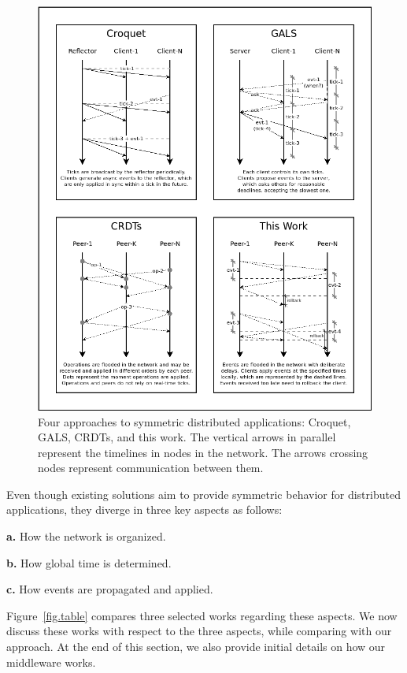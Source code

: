 \documentclass[fleqn,10pt]{SelfArx}
\begin{document}
\begin{figure}
  \centering
  \includegraphics[width=\linewidth]{algos}
  \caption{
    \label{fig.algos}
    Four approaches to symmetric distributed applications: Croquet, GALS,
    CRDTs, and this work.
    The vertical arrows in parallel represent the timelines in nodes in the
    network.
    The arrows crossing nodes represent communication between them.
  }
\end{figure}

Even though existing solutions aim to provide symmetric behavior for
distributed applications, they diverge in three key aspects as follows:

\textbf{a.} How the network is organized.

\textbf{b.} How global time is determined.

\textbf{c.} How events are propagated and applied.

Figure~\ref{fig.table} compares three selected works regarding these aspects.
We now discuss these works with respect to the three aspects, while comparing
with our approach.
At the end of this section, we also provide initial details on how our
middleware works.
\end{document}
